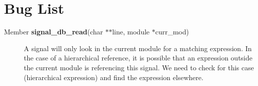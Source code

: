 \section{Bug List}\label{bug}
\begin{description}
\item[\label{_bug000001}
Member {\bf signal\_\-db\_\-read}(char $\ast$$\ast$line, module $\ast$curr\_\-mod) ]
A signal will only look in the current module for a matching expression. In the case of a hierarchical reference, it is possible that an expression outside the current module is referencing this signal. We need to check for this case (hierarchical expression) and find the expression elsewhere.\end{description}
 